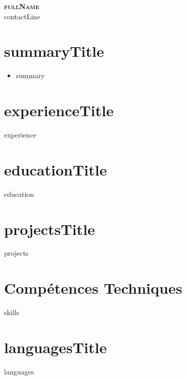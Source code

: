 \documentclass[letterpaper,12pt]{article}
\begin{document}
\begin{center}
    \textbf{\Huge \scshape {{fullName}}} \\[3pt]
    \footnotesize {{contactLine}}
\end{center}
\vspace{-5pt}

\section{{{summaryTitle}}}
\begin{itemize}[leftmargin=0.18in, label={}, itemsep=1.2pt, topsep=1.5pt, parsep=0pt]
\item \footnotesize {{summary}}
\end{itemize}\vspace{-3pt}

\section{{{experienceTitle}}}
{{experience}}\vspace{-2pt}

\section{{{educationTitle}}}
{{education}}\vspace{-1pt}

\section{{{projectsTitle}}}
{{projects}}\vspace{-3pt}

\section{Compétences Techniques}
{{skills}}\vspace{-3pt}

\section{{{languagesTitle}}}
{{languages}}
\end{document}
